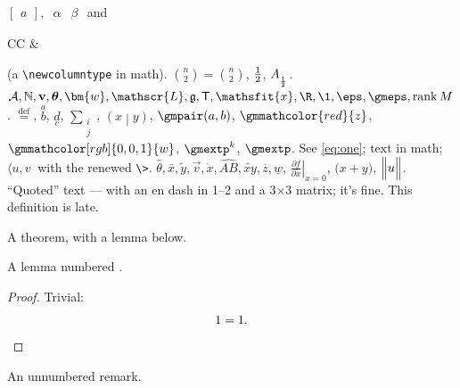 $\begin{bmatrix} a \end{bmatrix}$,
$\begin{array}{cc} \alpha & \beta \end{array}$ and
\begin{tabular}{CC} \alpha & \beta \end{tabular} (a \verb|\newcolumntype| in math).
$\binom{n}{2} = {n \choose 2}$, ${1 \over 2}$, $A_{_{1\over 2}}$.
$\mathcal{A}, \mathbb{N}, \mathbf{v}, \boldsymbol{\theta}, \bm{w}, \mathscr{L},
\mathfrak{g}, \mathsf{T}, \mathsfit{x}, \R, \1, \eps, \gmeps, \operatorname{rank} M$.
$\stackrel{\mathrm{def}}{=}$, $\overset{a}{b}$, $\underset{c}{d}$, $\sum_{\substack{i \\ j}}$,
$\left( x \middle| y \right)$, $\gmpair(a,b)$, $\gmmathcolor{red}{z}$, $\gmmathcolor[rgb]{0,0,1}{w}$, $\gmextp^{k}$, $\gmextp$.
See \eqref{eq:one}; $\text{text}$ in math; $\langle u, v \>$ with the renewed \verb|\>|.
$\hat{\theta}, \bar{x}, \tilde{y}, \vec{v}, \dot{x}, \widehat{AB}, \widetilde{xy},
\overline{z}, \underline{w}$, $\left. \frac{\partial f}{\partial x} \right\vert_{x=0}$,
$\bigl( x + y \bigr)$, $\Bigl\lVert u \Bigr\rVert$.
“Quoted” text — with an en dash in 1–2 and a 3×3 matrix; it’s fine.
\renewcommand{\arraystretch}{1.2}%
\newcommand{\gmlate}{late}This definition is \gmlate.
\begin{theorem}\label{thm:one} A theorem, with a lemma below. \end{theorem}
\begin{lemma} A lemma numbered \thelemma. \end{lemma}
\begin{proof} Trivial: \[ 1 = 1. \qedhere \] \end{proof}
\begin{remark*} An unnumbered remark. \end{remark*}

